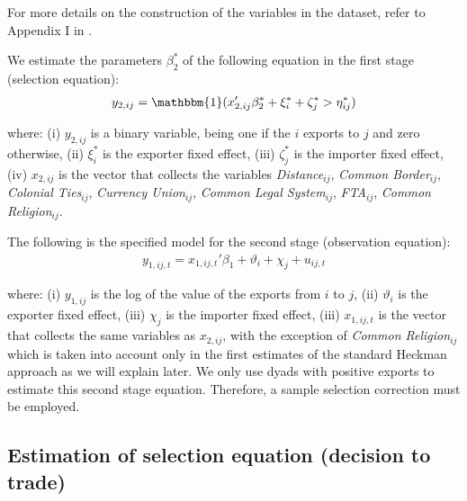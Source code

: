 For more details on the construction of the variables in the dataset, refer to Appendix I in \cite{helpman2008estimating}.

We estimate the parameters $\beta_2^*$ of the following equation in the first stage (selection equation):
\begin{align}
    y_{2,i j}= \mathbbm{1}(x_{2,ij}'\beta_2^* +\xi_{i}^*+\zeta_{j}^* >\eta_{i j}^*)
    \label{eq:app1}
\end{align}

\noindent where: (i) $y_{2,i j}$ is a binary variable, being one if the $i$ exports to $j$ and zero otherwise, (ii) $\xi_{i}^*$ is the exporter fixed effect, (iii) $\zeta_{j}^*$ is the importer fixed effect, (iv) $x_{2,ij}$ is the vector that collects the variables \textit{Distance}$_{ij}$, \textit{Common Border}$_{ij}$, \textit{Colonial Ties}$_{ij}$, \textit{Currency Union}$_{ij}$, \textit{Common Legal System}$_{ij}$, \textit{FTA}$_{ij}$, \textit{Common Religion}$_{ij}$.

The following is the specified model for the second stage (observation equation):
\begin{align}
    y_{1,ij,t} = x_{1,ij,t}'\beta_1 + \vartheta_i + \chi_j + u_{ij,t}
    \label{eq:app2}
\end{align}

\noindent where: (i) $y_{1,ij}$ is the log of the value of the exports from $i$ to $j$, (ii) $\vartheta_i$ is the exporter fixed effect, (iii) $\chi_j$ is the importer fixed effect, (iii) $x_{1,ij,t}$ is the vector that collects the same variables as $x_{2,ij}$, with the exception of \textit{Common Religion}$_{ij}$ which is taken into account only in the first estimates of the standard Heckman approach as we will explain later. We only use dyads with positive exports to estimate this second stage equation. Therefore, a sample selection correction must be employed.

\subsection{Estimation of selection equation (decision to trade)}

